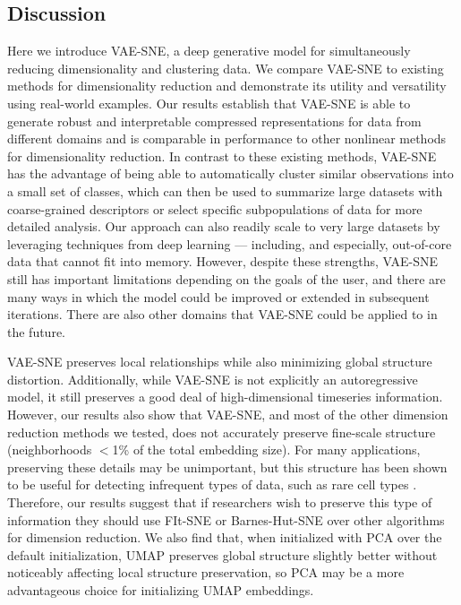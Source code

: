 \documentclass[11pt,a4paper,oneside]{book}
\begin{document}
\begin{doublespace}
\section{Discussion}
Here we introduce VAE-SNE, a deep generative model for simultaneously reducing dimensionality and clustering data. We compare VAE-SNE to existing methods for dimensionality reduction and demonstrate its utility and versatility using real-world examples. Our results establish that VAE-SNE is able to generate robust and interpretable compressed representations for data from different domains and is comparable in performance to other nonlinear methods for dimensionality reduction. In contrast to these existing methods, VAE-SNE has the advantage of being able to automatically cluster similar observations into a small set of classes, which can then be used to summarize large datasets with coarse-grained descriptors or select specific subpopulations of data for more detailed analysis. Our approach can also readily scale to very large datasets by leveraging techniques from deep learning --- including, and especially, out-of-core data that cannot fit into memory. However, despite these strengths, VAE-SNE still has important limitations depending on the goals of the user, and there are many ways in which the model could be improved or extended in subsequent iterations. There are also other domains that VAE-SNE could be applied to in the future.

VAE-SNE preserves local relationships while also minimizing global structure distortion. Additionally, while VAE-SNE is not explicitly an autoregressive model, it still preserves a good deal of high-dimensional timeseries information. However, our results also show that VAE-SNE, and most of the other dimension reduction methods we tested, does not accurately preserve fine-scale structure (neighborhoods $<$1\% of the total embedding size). For many applications, preserving these details may be unimportant, but this structure has been shown to be useful for detecting infrequent types of data, such as rare cell types \citep{linderman2019fast}. Therefore, our results suggest that if researchers wish to preserve this type of information they should use FIt-SNE \citep{linderman2017efficient, linderman2019fast} or Barnes-Hut-SNE \citep{van2014accelerating} over other algorithms for dimension reduction. We also find that, when initialized with PCA over the default initialization, UMAP \citep{mcinnes2018umap} preserves global structure slightly better without noticeably affecting local structure preservation, so PCA may be a more advantageous choice for initializing UMAP embeddings.


\end{doublespace}
\end{document}

